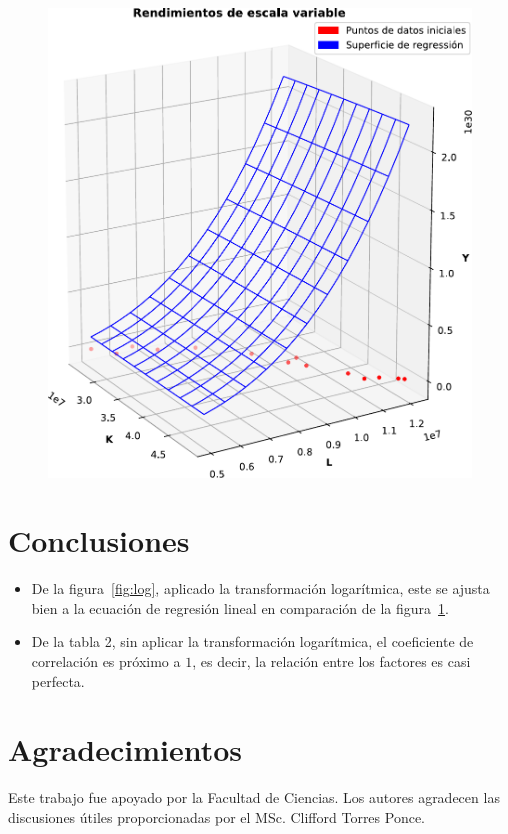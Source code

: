 \documentclass{sciposter}
\begin{document}
\begin{multicols*}{2}
\begin{figure}[ht!]
	\centering
	\includegraphics[width=0.25\paperwidth]{withoutnaturalog.pdf}
		\label{fig:notlog}
\end{figure}

\section{Conclusiones}
\begin{itemize}
	\item De la figura~\ref{fig:log}, aplicado la transformación logarítmica, este se ajusta bien a la ecuación de regresión lineal en comparación de la figura~\ref{fig:notlog}.
	\item De la tabla 2, sin aplicar la transformación logarítmica, el coeficiente de correlación es próximo a $1$, es decir, la relación entre los factores es casi perfecta.
\end{itemize}
\nocite{*} %

\section{Agradecimientos}
Este trabajo fue apoyado por la Facultad de Ciencias. Los autores agradecen las discusiones útiles proporcionadas por el MSc. Clifford Torres Ponce.
\end{multicols*}
\end{document}

